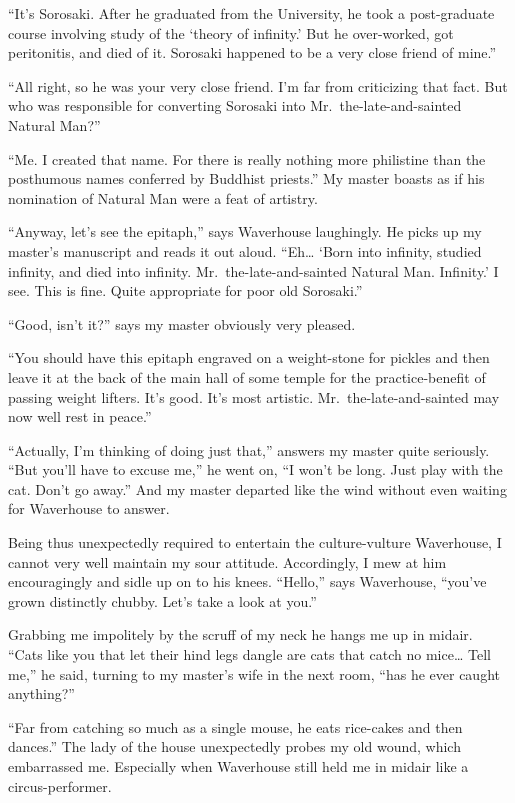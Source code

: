 \documentclass[12pt, openright]{book}
\begin{document}
``It's Sorosaki. After he graduated from the University, he took a
post-graduate course involving study of the `theory of infinity.' But he
over-worked, got peritonitis, and died of it. Sorosaki happened to be a
very close friend of mine.''

``All right, so he was your very close friend. I'm far from criticizing
that fact. But who was responsible for converting Sorosaki into
Mr.~the-late-and-sainted Natural Man?''

``Me. I created that name. For there is really nothing more philistine
than the posthumous names conferred by Buddhist priests.'' My master
boasts as if his nomination of Natural Man were a feat of artistry.

``Anyway, let's see the epitaph,'' says Waverhouse laughingly. He picks
up my master's manuscript and reads it out aloud. ``Eh\ldots{} `Born
into infinity, studied infinity, and died into infinity.
Mr.~the-late-and-sainted Natural Man. Infinity.' I see. This is fine.
Quite appropriate for poor old Sorosaki.''

``Good, isn't it?'' says my master obviously very pleased.

``You should have this epitaph engraved on a weight-stone for pickles
and then leave it at the back of the main hall of some temple for the
practice-benefit of passing weight lifters. It's good. It's most
artistic. Mr.~the-late-and-sainted may now well rest in peace.''

``Actually, I'm thinking of doing just that,'' answers my master quite
seriously. ``But you'll have to excuse me,'' he went on, ``I won't be
long. Just play with the cat. Don't go away.'' And my master departed
like the wind without even waiting for Waverhouse to answer.

Being thus unexpectedly required to entertain the culture-vulture
Waverhouse, I cannot very well maintain my sour attitude. Accordingly, I
mew at him encouragingly and sidle up on to his knees. ``Hello,'' says
Waverhouse, ``you've grown distinctly chubby. Let's take a look at
you.''

Grabbing me impolitely by the scruff of my neck he hangs me up in
midair. ``Cats like you that let their hind legs dangle are cats that
catch no mice\ldots{} Tell me,'' he said, turning to my master's wife in
the next room, ``has he ever caught anything?''

``Far from catching so much as a single mouse, he eats rice-cakes and
then dances.'' The lady of the house unexpectedly probes my old wound,
which embarrassed me. Especially when Waverhouse still held me in midair
like a circus-performer.
\end{document}
